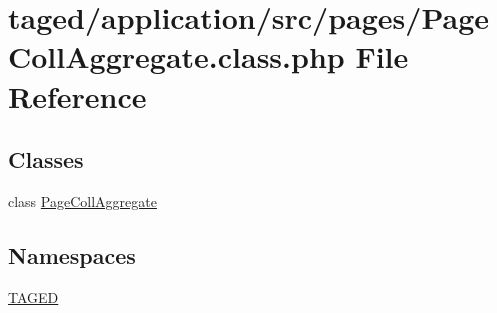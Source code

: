 \hypertarget{_page_coll_aggregate_8class_8php}{}\section{taged/application/src/pages/\+Page\+Coll\+Aggregate.class.\+php File Reference}
\label{_page_coll_aggregate_8class_8php}
\subsection*{Classes}
\begin{DoxyCompactItemize}
\item 
class \hyperlink{class_page_coll_aggregate}{Page\+Coll\+Aggregate}
\end{DoxyCompactItemize}
\subsection*{Namespaces}
\begin{DoxyCompactItemize}
\item 
 \hyperlink{namespace_t_a_g_e_d}{T\+A\+G\+ED}
\end{DoxyCompactItemize}
